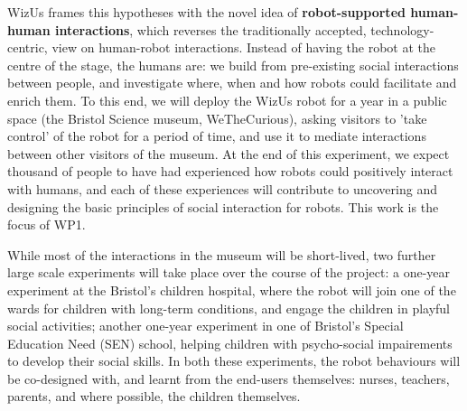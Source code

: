 \documentclass[11pt,a4paper]{report}
\newcommand{\project}{WizUs\xspace}
\begin{document}
\project frames this hypotheses with the novel
idea of \textbf{robot-supported human-human interactions}, which reverses the
traditionally accepted, technology-centric, view on human-robot interactions.
Instead of having the robot at the centre of the stage, the humans are: we build
from pre-existing social interactions between people, and investigate where,
when and how robots could facilitate and enrich them. To this end, we will
deploy the \project robot for a year in a public space (the Bristol Science
museum, WeTheCurious), asking visitors to 'take control' of the robot for a
period of time, and use it to mediate interactions between other visitors of the
museum.  At the end of this experiment, we expect thousand of people to have had
experienced how robots could positively interact with humans, and each of these experiences
will contribute to uncovering and designing the basic principles of social interaction for
robots. This work is the focus of WP1.

While most of the interactions in the museum will be short-lived, two further
large scale experiments will take place over the course of the project: a
one-year experiment at the Bristol's children hospital, where the robot will
join one of the wards for children with long-term conditions, and engage the
children in playful social activities; another one-year experiment in one of
Bristol's Special Education Need (SEN) school, helping children with
psycho-social impairements to develop their social skills. In both these
experiments, the robot behaviours will be co-designed with, and learnt from the
end-users themselves: nurses, teachers, parents, and where possible, the
children themselves.
\end{document}
